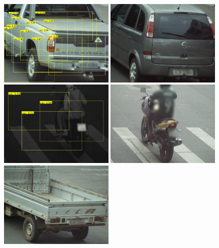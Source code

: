 \documentclass[12pt,oneside]{memoir}
\begin{document}
\begin{figure}[!htbp]
\centering
  \includegraphics[width=0.49\textwidth]{matfmaster/yolo/v4/without_augmentation/car_0f.jpg}
  \includegraphics[width=0.49\textwidth]{matfmaster/yolo/v4/without_augmentation/car_1f.jpg}
  \includegraphics[width=0.49\textwidth]{matfmaster/yolo/v4/without_augmentation/motorbike_0f.jpg}
  \includegraphics[width=0.49\textwidth]{matfmaster/yolo/v4/without_augmentation/motorbike_1f.jpg}
  \includegraphics[width=0.49\textwidth]{matfmaster/yolo/v4/without_augmentation/truck_0f.jpg}

\end{figure}
\end{document}
